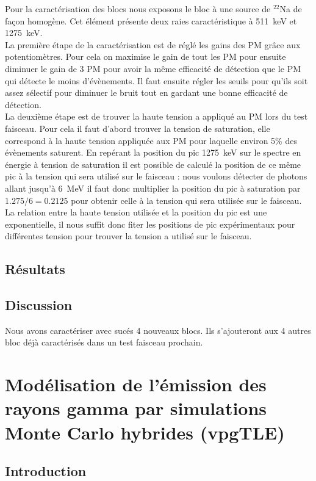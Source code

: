 \documentclass[11pt,a4paper,oldfontcommands]{memoir}
\begin{document}
Pour la caractérisation des blocs nous exposons le bloc à une source de $^{22}$Na de façon homogène. Cet élément présente deux raies caractéristique à 511~keV et 1275~keV. \\
La première étape de la caractérisation est de réglé les gains des PM grâce aux potentiomètres. Pour cela on maximise le gain de tout les PM pour ensuite diminuer le gain de 3 PM pour avoir la même efficacité de détection que le PM qui détecte le moins d'évènements. Il faut ensuite régler les seuils pour qu'ils soit assez sélectif pour diminuer le bruit tout en gardant une bonne efficacité de détection.\\
La deuxième étape est de trouver la haute tension a appliqué au PM lors du test faisceau. Pour cela il faut d'abord trouver la tension de saturation, elle correspond à la haute tension appliquée aux PM pour laquelle environ 5\% des évènements saturent. En repérant la position du pic 1275~keV sur le spectre en énergie à tension de saturation il est possible de calculé la position de ce même pic à la tension qui sera utilisé sur le faisceau : nous voulons détecter de photons allant jusqu'à 6~MeV il faut donc multiplier la position du pic à saturation par $1.275/6=0.2125$ pour obtenir celle à la tension qui sera utilisée sur le faisceau. La relation entre la haute tension utilisée et la position du pic est une exponentielle, il nous suffit donc fiter les positions de pic expérimentaux pour différentes tension pour trouver la tension a utilisé sur le faisceau. 

\section{Résultats}

\section{Discussion}
Nous avons caractériser avec sucés 4 nouveaux blocs. Ils s'ajouteront aux 4 autres bloc déjà caractérisés dans un test faisceau prochain. 


\chapter{Modélisation de l'émission des rayons gamma par simulations Monte Carlo hybrides (vpgTLE)}

\section{Introduction}
\end{document}
